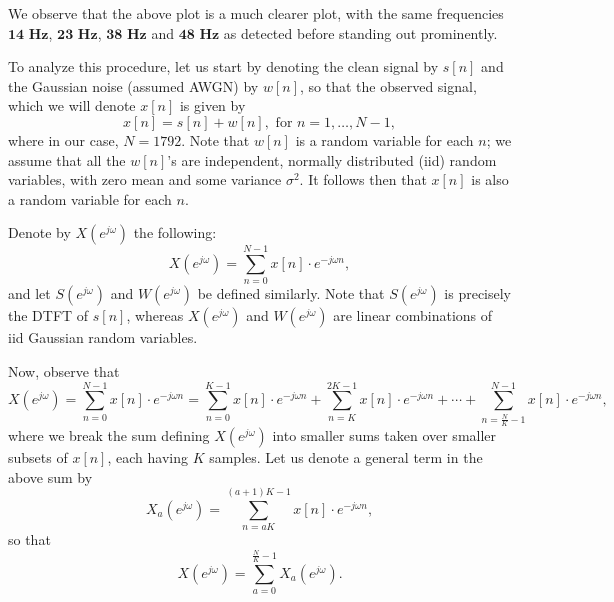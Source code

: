 \documentclass{article}[a4paper]
\begin{document}
	We observe that the above plot is a much clearer plot, with the same frequencies $\mathbf{14}\textbf{ Hz}$, $\mathbf{23}\textbf{ Hz}$, $\mathbf{38}\textbf{ Hz}$ and $\mathbf{48}\textbf{ Hz}$ as detected before standing out prominently.
	
	To analyze this procedure, let us start by denoting the clean signal by $s[n]$ and the Gaussian noise (assumed AWGN) by $w[n]$, so that the observed signal, which we will denote $x[n]$ is given by \[
		x[n] = s[n] + w[n], \text{ for } n = 1, \dots, N-1,
	\] where in our case, $N = 1792$. Note that $w[n]$ is a random variable for each $n$; we assume that all the $w[n]$'s are independent, normally distributed (iid) random variables, with zero mean and some variance $\sigma^2$. It follows then that $x[n]$ is also a random variable for each $n$.
	
	Denote by $X\left(e^{j\omega}\right)$ the following: \[
		X\left(e^{j\omega}\right)
		=
		\sum_{n=0}^{N-1} x[n] \cdot e^{-j\omega n},
	\] and let $S\left(e^{j\omega}\right)$ and $W\left(e^{j\omega}\right)$ be defined similarly. Note that $S\left(e^{j\omega}\right)$ is precisely the DTFT of $s[n]$, whereas $X\left(e^{j\omega}\right)$ and $W\left(e^{j\omega}\right)$ are linear combinations of iid Gaussian random variables.
	
	Now, observe that \[
		X\left(e^{j\omega}\right)
		=
		\sum_{n=0}^{N-1} x[n] \cdot e^{-j\omega n}
		=
		\sum_{n=0}^{K-1} x[n] \cdot e^{-j\omega n}
		+
		\sum_{n=K}^{2K-1} x[n] \cdot e^{-j\omega n}
		+
		\cdots
		+
		\sum_{n=\frac{N}{K} - 1}^{N-1} x[n] \cdot e^{-j\omega n},
	\] where we break the sum defining $X\left(e^{j\omega}\right)$ into smaller sums taken over smaller subsets of $x[n]$, each having $K$ samples. Let us denote a general term in the above sum by \[
		X_a\left(e^{j\omega}\right)
		=
		\sum_{n=aK}^{(a+1)K-1} x[n] \cdot e^{-j\omega n},
	\] so that \[
		X\left(e^{j\omega}\right)
		=
		\sum_{a=0}^{\frac{N}{K}-1} X_a\left(e^{j\omega}\right).
	\]
	
\end{document}
